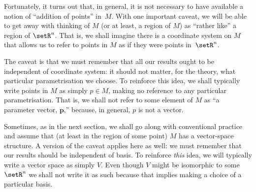 \documentclass[10pt, a4paper]{article}
\begin{document}
Fortunately, it turns out that, in general, it is not necessary to
have available a notion of ``addition of points'' in~$M$. With one
important caveat, we will be able to get away with thinking of $M$ (or
at least, a region of $M$) as ``rather like'' a region of
$\setR^n$. That is, we shall imagine there is a coordinate system on
$M$ that allows us to refer to points in $M$ as if they were points
in~$\setR^n$.

The caveat is that we must remember that all our results ought to be
independent of coordinate system: it should not matter, for the
theory, what particular parametrisation we choose. To reinforce this
idea, we shall typically write points in $M$ as simply $p\in M$, making
no reference to any particular parametrisation. That is, we shall not
refer to some element of $M$ as ``a parameter vector,
$\mathbold{p}$,'' because, in general, $p$ is not a
vector.

Sometimes, as in the next section, we shall go along with conventional
practice and assume that (at least in the region of some point) $M$
has a vector-space structure. A version of the caveat applies here as
well: we must remember that our results should be independent of
basis. To reinforce \emph{this} idea, we will typically write a vector
space as simply $V$. Even though $V$ might be isomorphic to some
$\setR^n$ we shall not write it as such because that implies making a
choice of a particular basis.

\end{document}
